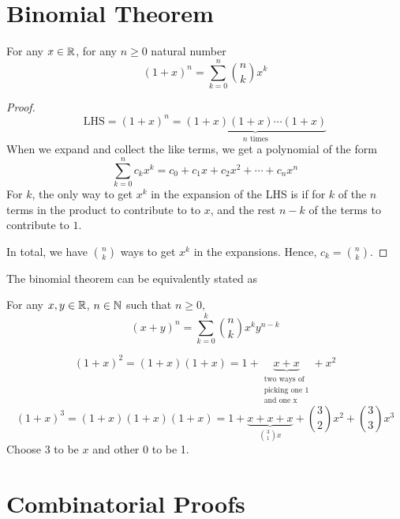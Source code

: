 



\section{Binomial Theorem}

\begin{theorem}
    For any $x \in \mathbb{R}$, for any $n \geq 0$ natural number
    $$
    (1+x)^n = \sum_{k=0}^n \binom{n}{k} x^k
    $$
\end{theorem}

\begin{proof}
    $$
    \text{LHS} = (1+x)^n = \underbrace{(1+x) (1+x) \cdots (1+x)}_{\text{$n$ times}}
    $$
    When we expand and collect the like terms, we get a polynomial of the form
    $$
    \sum_{k=0}^n c_k x^k = c_0 + c_1x + c_2 x^2 + \cdots + c_n x^n
    $$
    For $k$, the only way to get $x^k$ in the expansion of the LHS is if for $k$ of the $n$ terms in the product to contribute to to $x$, and the rest $n-k$ of the terms to contribute to $1$.

    In total, we have $\binom{n}{k}$ ways to get $x^k$ in the expansions. Hence, $c_k = \binom{n}{k}$.
\end{proof}

The binomial theorem can be equivalently stated as
\begin{theorem}
    For any $x,y \in \mathbb{R}$, $n \in \mathbb{N}$ such that $n \geq 0$,
    $$
    (x+y)^n = \sum_{k=0}^k \binom{n}{k} x^k y^{n-k}
    $$
\end{theorem}

\begin{example}
    $$
    (1+x)^2 = (1 + x)(1 + x) = 1 + \underbrace{x + x}_{\substack{\text{two ways of} \\  \text{picking one 1} \\ \text{and one x}}} + x^2
    $$
    $$
    (1+x)^3 = (1+x) (1+x) (1+x) = 1 + \underbrace{x + x + x}_{\binom{3}{1}x} + \binom{3}{2} x^2 + \binom{3}{3}x^3
    $$
    Choose 3 to be $x$ and other 0 to be 1.
\end{example}

\section{Combinatorial Proofs}

